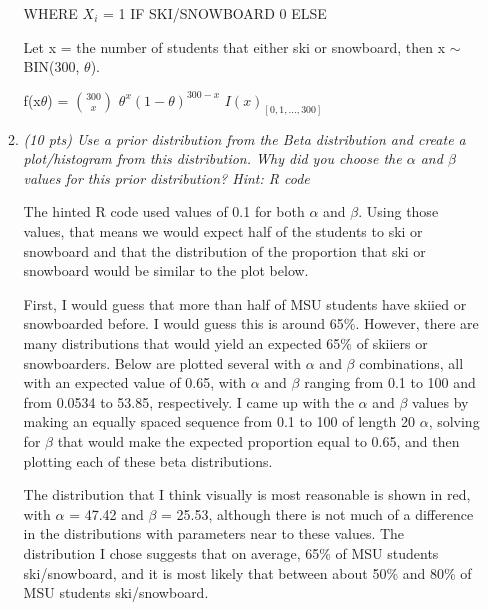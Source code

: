 \documentclass{article}\usepackage[]{graphicx}\usepackage[]{color}
\begin{document}
\begin{enumerate}
\begin{enumerate}
WHERE $X_{i}$ = 1 IF SKI/SNOWBOARD 0 ELSE

Let x = the number of students that either ski or snowboard, then x $\sim$ BIN(300, $\theta$).


f(x\vert$\theta$) = $\binom{300}{x}$ $\theta^{x}(1-\theta)^{300-x}$ \cdot $I(x)_{[0,1,...,300]}$


\item %
{\it (10 pts) Use a prior distribution from the Beta distribution and create a plot/histogram from this distribution. Why did you choose the $\alpha$ and $\beta$ values for this prior distribution? Hint: R code}

The hinted R code used values of 0.1 for both $\alpha$ and $\beta$. Using those values, that means we would expect half of the students to ski or snowboard and that the distribution of the proportion that ski or snowboard would be similar to the plot below.

First, I would guess that more than half of MSU students have skiied or snowboarded before. I would guess this is around 65\%. However, there are many distributions that would yield an expected 65\% of skiiers or snowboarders. Below are plotted several with $\alpha$ and $\beta$ combinations, all with an expected value of 0.65, with $\alpha$ and $\beta$ ranging from 0.1 to 100 and from 0.0534 to 53.85, respectively. I came up with the $\alpha$ and $\beta$ values by making an equally spaced sequence from 0.1 to 100 of length 20 $\alpha$, solving for $\beta$ that would make the expected proportion equal to 0.65, and then plotting each of these beta distributions.

The distribution that I think visually is most reasonable is shown in red, with $\alpha$ = 47.42 and $\beta$ = 25.53, although there is not much of a difference in the distributions with parameters near to these values. The distribution I chose suggests that on average, 65\% of MSU students ski/snowboard, and it is most likely that between about 50\% and 80\% of MSU students ski/snowboard.




\end{enumerate}
\end{enumerate}
\end{document}
